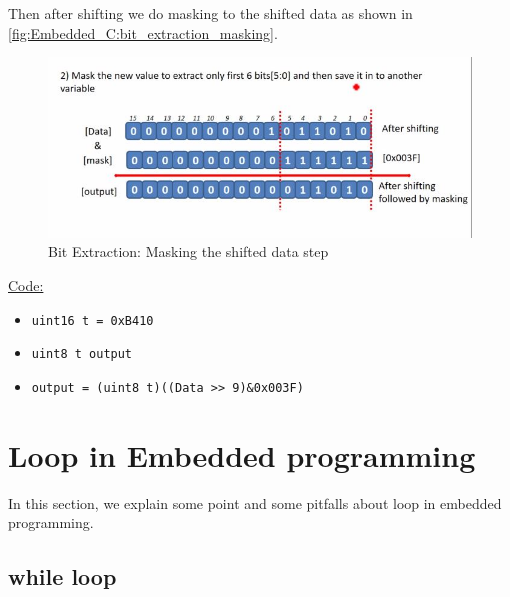 \newpage
Then after shifting we do masking to the shifted data as shown in \autoref{fig:Embedded_C:bit_extraction_masking}.

\begin{figure}[h]
\centering
\includegraphics[scale=0.7]{Figures/Embedded_C/bit_extraction_masking}
\caption{Bit Extraction: Masking the shifted data step}
\label{fig:Embedded_C:bit_extraction_masking}
\end{figure}


\underline{Code:}
\begin{itemize}
    \item \verb|uint16 t = 0xB410|
    
    \item  \verb|uint8 t output |
    
    \item \verb|output = (uint8 t)((Data >> 9)&0x003F)|
    
\end{itemize}


\newpage

\section{Loop in Embedded programming}

In this section, we explain some point and some pitfalls about loop in embedded programming.

\subsection{while loop}

